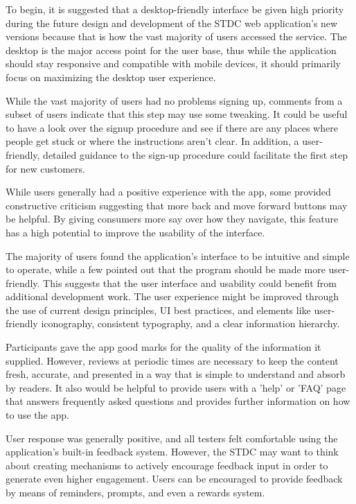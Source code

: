 \begin{justify}
\vspace{0.25cm}
\newendline To begin, it is suggested that a desktop-friendly interface be given high priority during the future design and development of the STDC web application’s new versions because that is how the vast majority of users accessed the service. The desktop is the major access point for the user base, thus while the application should stay responsive and compatible with mobile devices, it should primarily focus on maximizing the desktop user experience.

\vspace{0.25cm}
\newendline While the vast majority of users had no problems signing up, comments from a subset of users indicate that this step may use some tweaking. It could be useful to have a look over the signup procedure and see if there are any places where people get stuck or where the instructions aren't clear. In addition, a user-friendly, detailed guidance to the sign-up procedure could facilitate the first step for new customers.

\vspace{0.25cm}
\newendline While users generally had a positive experience with the app, some provided constructive criticism suggesting that more back and move forward buttons may be helpful. By giving consumers more say over how they navigate, this feature has a high potential to improve the usability of the interface.

\vspace{0.25cm}
\newendline The majority of users found the application's interface to be intuitive and simple to operate, while a few pointed out that the program should be made more user-friendly. This suggests that the user interface and usability could benefit from additional development work. The user experience might be improved through the use of current design principles, UI best practices, and elements like user-friendly iconography, consistent typography, and a clear information hierarchy.

\vspace{0.25cm}
\newendline Participants gave the app good marks for the quality of the information it supplied. However, reviews at periodic times are necessary to keep the content fresh, accurate, and presented in a way that is simple to understand and absorb by readers. It also would be helpful to provide users with a 'help' or 'FAQ' page that answers frequently asked questions and provides further information on how to use the app.

\vspace{0.25cm}
\newendline User response was generally positive, and all testers felt comfortable using the application's built-in feedback system. However, the STDC may want to think about creating mechanisms to actively encourage feedback input in order to generate even higher engagement. Users can be encouraged to provide feedback by means of reminders, prompts, and even a rewards system.


\end{justify}
